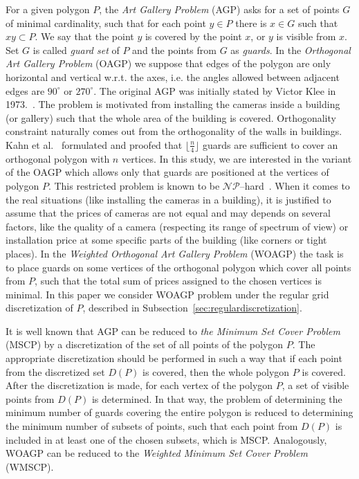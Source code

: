 \documentclass[runningheads,a4paper]{elsarticle}
\begin{document}
	For a given polygon $P$, the \emph{Art Gallery Problem} (AGP) asks for a set of points $G$ of minimal cardinality,  such that for each point $y \in P$ there is $x \in G$ such that $xy \subset P$. We say that the point $y$ is covered by the point $x$, or $y$ is visible from $x$. Set $G$ is called \emph{guard set} of $P$ and the points from $G$ as \emph{guards}. In the \emph{Orthogonal Art Gallery Problem} (OAGP) we suppose that edges of the polygon are only horizontal and vertical w.r.t. the axes, i.e.  the angles allowed between adjacent edges are  $90^{\circ}$ or $270^{\circ}$. The original AGP was initially stated by Victor  Klee in 1973.~\cite{o1987art}.  The problem is motivated from installing the cameras inside a building (or gallery) such that the whole area of the building is covered. Orthogonality constraint naturally comes out from the orthogonality of the walls in buildings. Kahn et al.~\cite{kahn1983traditional} formulated and proofed that 	$\lfloor \frac{n}{4} \rfloor$ guards are  sufficient to cover an orthogonal polygon with $n$ vertices.      In this study, we are interested in the variant of the OAGP which allows only that guards are positioned at the vertices of polygon $P$. This restricted problem is known to be $\mathcal{NP}$--hard~\cite{schuchardt1995two,katz2008guarding}.  When it comes to the real situations (like installing the cameras in a building), it is justified to assume that the prices of cameras are not equal and may depends on several factors, like the quality of a camera   (respecting its range of spectrum of view)  or installation price at some specific parts of the building (like corners or tight places).  In the \emph{Weighted Orthogonal Art Gallery Problem} (WOAGP) the task is to place guards on some vertices of the orthogonal polygon which cover all points from $P$, such that the total sum of prices assigned to the chosen vertices is minimal. In this paper we consider WOAGP problem under the regular grid discretization of $P$, described in Subsection~\ref{sec:regulardiscretization}.
	
	It is well known that AGP can be reduced to \emph{the Minimum Set Cover Problem} (MSCP) by a discretization of the set of all points of the polygon $P$. The appropriate discretization should be performed in such a way that if each point from the discretized set $D(P)$ is covered, then the whole polygon $P$ is covered. After the discretization is made, for each vertex of the polygon $P$, a set of visible points from $D(P)$ is determined. In that way, the problem of determining the minimum number of guards covering the entire polygon is reduced to determining the minimum number of subsets of points, such that each point from $D(P)$ is included in at least one of the chosen subsets, which is MSCP. Analogously, WOAGP can be reduced to the \emph{Weighted Minimum Set Cover Problem} (WMSCP).
	
\end{document}
